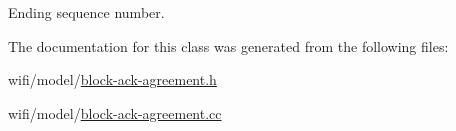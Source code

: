Ending sequence number. 



The documentation for this class was generated from the following files\+:\begin{DoxyCompactItemize}
\item 
wifi/model/\hyperlink{block-ack-agreement_8h}{block-\/ack-\/agreement.\+h}\item 
wifi/model/\hyperlink{block-ack-agreement_8cc}{block-\/ack-\/agreement.\+cc}\end{DoxyCompactItemize}
